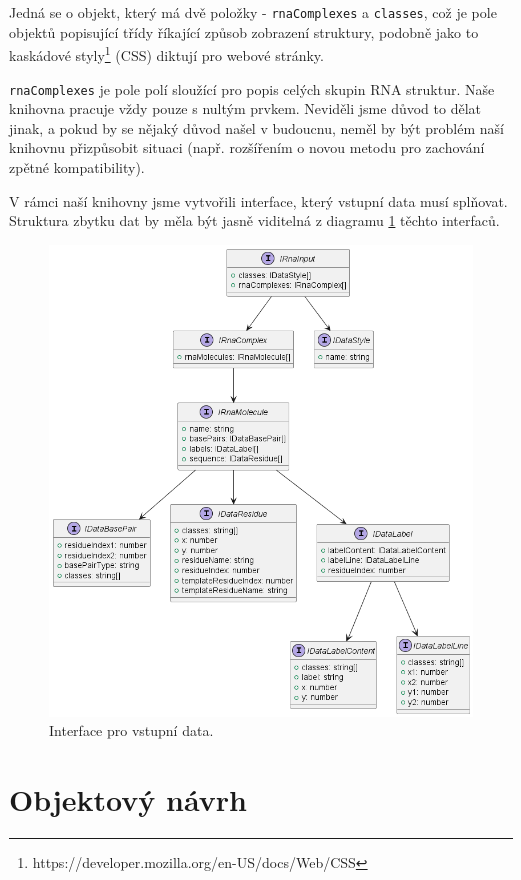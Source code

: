 Jedná se o objekt, který má dvě položky - \texttt{rnaComplexes} a
\texttt{classes}, což je pole objektů popisující třídy říkající způsob
zobrazení struktury, podobně jako to kaskádové
styly\footnote{https://developer.mozilla.org/en-US/docs/Web/CSS} (CSS) diktují
pro webové stránky. 

\texttt{rnaComplexes} je pole polí sloužící pro popis celých skupin RNA
struktur. Naše knihovna pracuje vždy pouze s nultým prvkem. Neviděli jsme důvod
to dělat jinak, a pokud by se nějaký důvod našel v budoucnu, neměl by být
problém naší knihovnu přizpůsobit situaci (např. rozšířením o novou metodu pro
zachování zpětné kompatibility).

V rámci naší knihovny jsme vytvořili interface, který vstupní data musí
splňovat. Struktura zbytku dat by měla být jasně viditelná z diagramu
\ref{datainter} těchto interfaců.

\begin{figure}[H]
  \centering
  \includegraphics[width=145mm]{../img/kap03/rnaInput.png}
  \caption[Interface pro vstupní data]{Interface pro vstupní data.}
  \label{datainter}
\end{figure}

\section{Objektový návrh}

